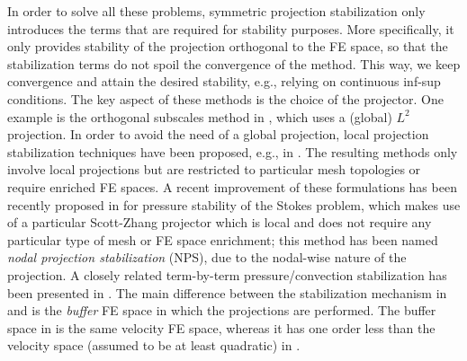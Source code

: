 In order to solve all these problems, symmetric projection stabilization only introduces the terms that are required for stability purposes. More specifically, it only provides stability of the projection orthogonal to the FE space, so that the stabilization terms do not spoil the convergence of the method. %
This way, we keep convergence and attain the desired stability, e.g., relying on continuous inf-sup conditions. The key aspect of these methods is the choice of the projector. One example  is the orthogonal subscales method in \cite{codina_stabilization_2000}, which uses a (global) $L^2$ projection. In order to avoid the need of a global projection, local projection stabilization techniques have been proposed, e.g., in \cite{braack_local_2006,matthies_unified_2007}. The resulting methods only involve local projections but are restricted to particular mesh topologies or require enriched FE spaces. A recent improvement of these formulations has been recently proposed in \cite{badia_stabilized_2012} for pressure stability of the Stokes problem, which makes use of  a particular Scott-Zhang projector which is local and does not require any particular type of mesh or FE space enrichment; this method has been named \emph{nodal projection stabilization} (NPS), due to the nodal-wise nature of the projection. A closely related term-by-term pressure/convection stabilization has been presented in \cite{rebollo_high_2013}. The main difference between the stabilization mechanism in \cite{badia_stabilized_2012} and  \cite{rebollo_high_2013} is the \emph{buffer} FE space in which the projections are performed. The buffer space in \cite{badia_stabilized_2012} is the same velocity FE space, whereas  it has one order less than the velocity space (assumed to be at least quadratic) in \cite{rebollo_high_2013}.



